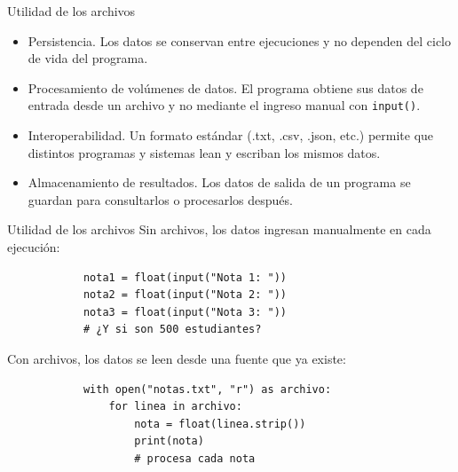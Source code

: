 \documentclass{beamer}
\begin{document}
    \begin{frame}[fragile, t]{Utilidad de los archivos}
        \begin{itemize}
            \item Persistencia. Los datos se conservan entre ejecuciones y no dependen del ciclo de vida del programa. 
            \pause
            \item Procesamiento de volúmenes de datos. El programa obtiene sus datos de entrada desde un archivo y no mediante
            el ingreso manual con \texttt{input()}.
            \pause
            \item Interoperabilidad. Un formato estándar (.txt, .csv, .json, etc.) permite que distintos programas y sistemas lean 
            y escriban los mismos datos.
            \pause
            \item Almacenamiento de resultados. Los datos de salida de un programa se guardan para consultarlos o procesarlos después.
        \end{itemize}
    \end{frame}


    \begin{frame}[fragile, t]{Utilidad de los archivos}
        Sin archivos, los datos ingresan manualmente en cada ejecución:
        \begin{verbatim}
            nota1 = float(input("Nota 1: "))
            nota2 = float(input("Nota 2: "))
            nota3 = float(input("Nota 3: "))
            # ¿Y si son 500 estudiantes?
        \end{verbatim}
        Con archivos, los datos se leen desde una fuente que ya existe:
        \begin{verbatim}
            with open("notas.txt", "r") as archivo:
                for linea in archivo:
                    nota = float(linea.strip())
                    print(nota)
                    # procesa cada nota
        \end{verbatim}
    \end{frame}
\end{document}

